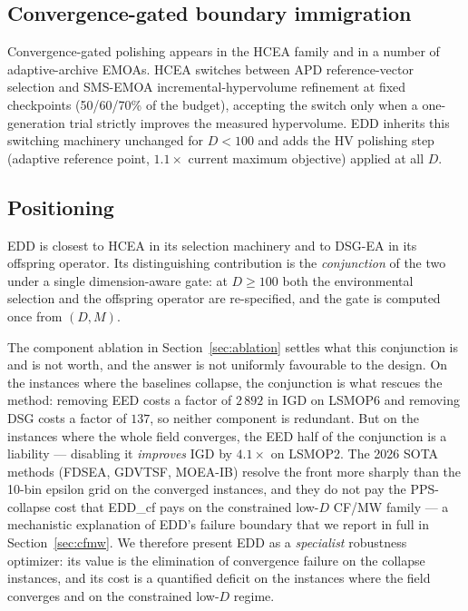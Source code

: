 \documentclass[preprint,12pt]{elsarticle}
\begin{document}
\subsection{Convergence-gated boundary immigration}

Convergence-gated polishing appears in the HCEA family
\cite{hcea2026} and in a number of adaptive-archive EMOAs. HCEA
switches between APD reference-vector selection and SMS-EMOA
\cite{beume2007smsemoa} incremental-hypervolume refinement at fixed
checkpoints (50/60/70\% of the budget), accepting the switch only when a
one-generation trial strictly improves the measured hypervolume. EDD
inherits this switching machinery unchanged for $D < 100$ and adds the HV
polishing step (adaptive reference point, $1.1\times$ current maximum
objective) applied at all $D$.

\subsection{Positioning}

EDD is closest to HCEA \cite{hcea2026} in its selection machinery and to
DSG-EA \cite{zou2024two} in its offspring operator. Its distinguishing
contribution is the \emph{conjunction} of the two under a single
dimension-aware gate: at $D \ge 100$ both the environmental selection and the
offspring operator are re-specified, and the gate is computed once from
$(D, M)$.

The component ablation in Section~\ref{sec:ablation} settles what this
conjunction is and is not worth, and the answer is not uniformly favourable
to the design. On the instances where the baselines collapse, the conjunction
is what rescues the method: removing EED costs a factor of $2\,892$ in IGD on
LSMOP6 and removing DSG costs a factor of $137$, so neither component is
redundant. But on the instances where the whole field converges, the EED half
of the conjunction is a liability --- disabling it \emph{improves} IGD by
$4.1\times$ on LSMOP2. The 2026 SOTA methods (FDSEA, GDVTSF, MOEA-IB)
resolve the front more sharply than the 10-bin epsilon grid on the
converged instances, and they do not pay the PPS-collapse cost that EDD\_cf
pays on the constrained low-$D$ CF/MW family --- a mechanistic explanation
of EDD's failure boundary that we report in full in
Section~\ref{sec:cfmw}. We therefore present EDD as a \emph{specialist}
robustness optimizer: its value is the elimination of convergence failure on
the collapse instances, and its cost is a quantified deficit on the
instances where the field converges and on the constrained low-$D$ regime.
\end{document}
